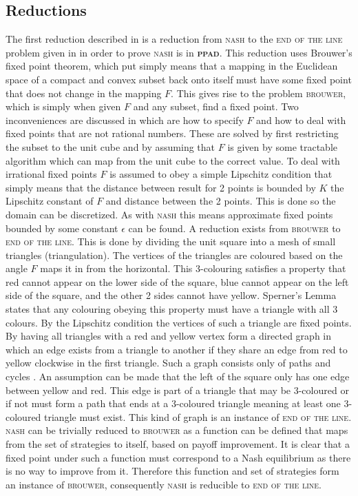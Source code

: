 \documentclass{article}
\begin{document}
\begin{multicols}{2}
\section{Reductions}
The first reduction described in \cite{Daskalakis.2009} is a reduction from \textsc{nash} to the \textsc{end of the line} problem given in \cite{Daskalakis.2009} in order to prove \textsc{nash} is in \textbf{\textsc{ppad}}. This reduction uses Brouwer's fixed point theorem, which put simply means that a mapping in the Euclidean space of a compact and convex subset back onto itself must have some fixed point that does not change in the mapping $F$. This gives rise to the problem \textsc{brouwer}, which is simply when given $F$ and any subset, find a fixed point. Two inconveniences are discussed in \cite{Daskalakis.2009} which are how to specify $F$ and how to deal with fixed points that are not rational numbers. These are solved by first restricting the subset to the unit cube and by assuming that $F$ is given by some tractable algorithm which can map from the unit cube to the correct value. To deal with irrational fixed points $F$ is assumed to obey a simple Lipschitz condition that simply means that the distance between result for 2 points is bounded by $K$ the Lipschitz constant of $F$ and distance between the 2 points. This is done so the domain can be discretized. As with \textsc{nash} this means approximate fixed points bounded by some constant $\epsilon$ can be found. A reduction exists from \textsc{brouwer} to \textsc{end of the line}\cite{Daskalakis.2009}. This is done by dividing the unit square into a mesh of small triangles (triangulation). The vertices of the triangles are coloured based on the angle $F$ maps it in from the horizontal. This 3-colouring satisfies a property that red cannot appear on the lower side of the square, blue cannot appear on the left side of the square, and the other 2 sides cannot have yellow. Sperner's Lemma states that any colouring obeying this property must have a triangle with all 3 colours. By the Lipschitz condition the vertices of such a triangle are fixed points. By having all triangles with a red and yellow vertex form a directed graph in which an edge exists from a triangle to another if they share an edge from red to yellow clockwise in the first triangle. Such a graph consists only of paths and cycles \cite{Daskalakis.2009}. An assumption can be made that the left of the square only has one edge between yellow and red. This edge is part of a triangle that may be 3-coloured or if not must form a path that ends at a 3-coloured triangle meaning at least one 3-coloured triangle must exist. This kind of graph is an instance of \textsc{end of the line}\cite{Daskalakis.2009}. \textsc{nash} can be trivially reduced to \textsc{brouwer} as a function can be defined that maps from the set of strategies to itself, based on payoff improvement. It is clear that a fixed point under such a function must correspond to a Nash equilibrium as there is no way to improve from it. Therefore this function and set of strategies form an instance of \textsc{brouwer}, consequently \textsc{nash} is reducible to \textsc{end of the line}.\par

\end{multicols}
\end{document}
